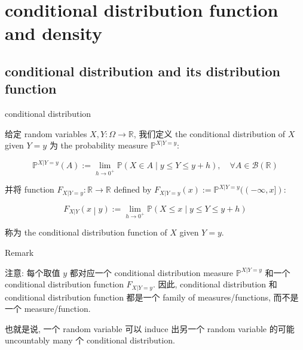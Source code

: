 \documentclass{qlnotes-export}
\begin{document}
\section{conditional distribution function and density}\label{conditional-distribution-function-and-density}

\subsection{conditional distribution and its distribution function}\label{conditional-distribution-and-its-distribution-function}

\begin{definition}{conditional distribution}\label{def-03-joint-conditional-distribution-conditional-distribution}

给定 random variables \(X,Y:\Omega\rightarrow{\mathbb{R}}\), 我们定义 the conditional distribution of \(X\) given \(Y = y\) 为 the probability measure \({\mathbb{P}}^{X|Y = y}\):

\[{\mathbb{P}}^{X|Y = y}(A) := \lim\limits_{h\rightarrow 0^{+}}{\mathbb{P}}(X \in A \mid y \leq Y \leq y + h),\quad\forall A \in \mathcal{B}({\mathbb{R}})\]

并将 function \(F_{X|Y = y}:{\mathbb{R}}\rightarrow{\mathbb{R}}\) defined by \(F_{X|Y = y}(x) := {\mathbb{P}}^{X|Y = y}(( - \infty,x\rbrack)\):

\[\left. F_{X|Y}(x \middle| y) := \lim\limits_{h\rightarrow 0^{+}}{\mathbb{P}}(X \leq x \mid y \leq Y \leq y + h) \right.\]

称为 the conditional distribution function of \(X\) given \(Y = y\).

\end{definition}

\begin{qlremark}{Remark}

注意: 每个取值 \(y\) 都对应一个 conditional distribution measure \({\mathbb{P}}^{X|Y = y}\) 和一个 conditional distribution function \(F_{X|Y = y}\). 因此, conditional distribution 和 conditional distribution function 都是一个 family of measures/functions, 而不是一个 measure/function.

也就是说, 一个 random variable 可以 induce 出另一个 random variable 的可能 uncountably many 个 conditional distribution.

\end{qlremark}
\end{document}
